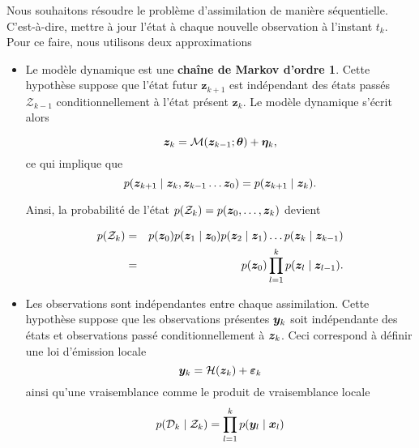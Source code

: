 
Nous souhaitons résoudre le problème d'assimilation de manière séquentielle. C'est-à-dire, mettre à jour l'état à chaque nouvelle observation à l'instant $t_k$. Pour ce faire, nous utilisons deux approximations

\begin{itemize}
    \item Le modèle dynamique est une \textbf{chaîne de Markov d'ordre 1}. Cette hypothèse suppose que l'état futur $\bm z_{k+1}$ est indépendant des états passés $\mathcal Z_{k-1}$ conditionnellement à l'état présent $\bm z_{k}$. Le modèle dynamique s'écrit alors

          \begin{equation*}
              \bm z_k = \mathcal{M}(\bm z_{k-1} ; \bm \theta) + \bm \eta_k,
          \end{equation*}ce qui implique que
          \begin{equation*}
              p(\bz_{k+1} \mid \bz_{k},\bz_{k-1}\dots \bz_{0}) = p(\bz_{k+1} \mid \bz_{k}).
          \end{equation*}

          Ainsi, la probabilité de l'état $p(\mathcal{Z}_k)=p(\bm z_0, \dots, \bm z_k)$ devient

          \begin{eqnarray*}
              p(\mathcal{Z}_k) &=& p(\bm z_0) p(\bm z_1 \mid \bm z_0) p(\bm z_2 \mid \bm z_1) \dots p(\bm z_k \mid \bm z_{k-1}) \\
              &=& p(\bm z_0) \prod_{l = 1}^{k} p(\bm z_l \mid \bm z_{l-1}).
          \end{eqnarray*}

    \item Les observations sont indépendantes entre chaque assimilation. Cette hypothèse suppose que les observations présentes $\bm{y}_k$ soit indépendante des états et observations passé conditionnellement à $\bm z_k$. Ceci correspond à définir une loi d'émission locale
          \begin{equation*}
              \bm{y}_k = \mathcal H (\bm z_k) + \bm{\varepsilon}_k
          \end{equation*}
          ainsi qu'une vraisemblance comme le produit de vraisemblance locale
          \begin{equation*}
              p(\mathcal{D}_k \mid \mathcal Z_k) = \prod_{l=1}^{k} p(\bm{y}_l \mid \bm{x}_l)
          \end{equation*}
\end{itemize}

